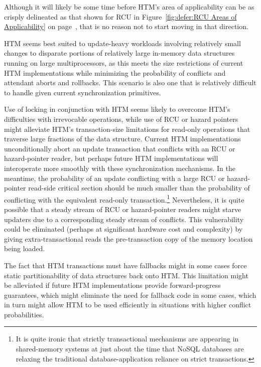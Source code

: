 Although it will likely be some time before HTM's area of applicability
can be as crisply delineated as that shown for RCU in
Figure~\ref{fig:defer:RCU Areas of Applicability} on
page~\pageref{fig:defer:RCU Areas of Applicability}, that is no reason not to
start moving in that direction.

HTM seems best suited to update-heavy workloads involving relatively
small changes to disparate portions of relatively large in-memory
data structures running on large multiprocessors,
as this meets the size restrictions of current HTM implementations while
minimizing the probability of conflicts and attendant aborts and
rollbacks.
This scenario is also one that is relatively difficult to handle given
current synchronization primitives.

Use of locking in conjunction with HTM seems likely to overcome HTM's
difficulties with irrevocable operations, while use of RCU or
hazard pointers might alleviate HTM's transaction-size limitations
for read-only operations that traverse large fractions of the data
structure.
Current HTM implementations unconditionally abort an update transaction
that conflicts with an RCU or hazard-pointer reader, but perhaps future
HTM implementations will interoperate more smoothly with these
synchronization mechanisms.
In the meantime, the probability of an update conflicting with a
large RCU or hazard-pointer read-side critical section should be
much smaller than the probability of conflicting with the equivalent
read-only transaction.\footnote{
	It is quite ironic that strictly transactional mechanisms are
	appearing in shared-memory systems at just about the time
	that NoSQL databases are relaxing the traditional
	database-application reliance on strict transactions.}
Nevertheless, it is quite possible that a steady stream of RCU or
hazard-pointer readers might starve updaters due to a corresponding
steady stream of conflicts.
This vulnerability could be eliminated (perhaps at significant
hardware cost and complexity) by giving extra-transactional
reads the pre-transaction copy of the memory location being loaded.

The fact that HTM transactions must have fallbacks might in some cases
force static partitionability of data structures back onto HTM.
This limitation might be alleviated if future HTM implementations
provide forward-progress guarantees, which might eliminate the need
for fallback code in some cases, which in turn might allow HTM to
be used efficiently in situations with higher conflict probabilities.

